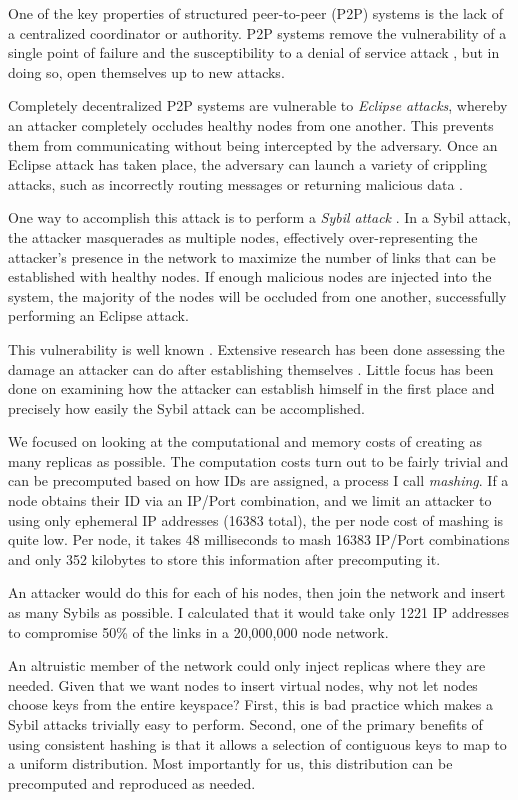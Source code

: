 One of the key properties of structured peer-to-peer (P2P) systems is the lack of a centralized coordinator or authority.
P2P systems remove the vulnerability of a single point of failure and the susceptibility to a denial of service attack \cite{sybil}, but in doing so, open themselves up to new attacks.

Completely decentralized P2P systems are vulnerable to \textit{Eclipse attacks}, whereby an attacker completely occludes healthy nodes from one another.
This prevents them from communicating without being intercepted by the adversary.
Once an Eclipse attack has taken place, the adversary can launch a variety of crippling attacks, such as incorrectly routing messages or returning malicious data \cite{srivatsa2004vulnerabilities}.



One way to accomplish this attack is to perform a \emph{Sybil attack} \cite{sybil}.
In a Sybil attack, the attacker masquerades as multiple nodes, effectively over-representing the attacker's presence in the network to maximize the number of links that can be established with healthy nodes.
If enough malicious nodes are injected into the system, the majority of the nodes will be occluded from one another, successfully performing an Eclipse attack.

This vulnerability is well known \cite{dhtsec}. 
Extensive research has been done assessing the damage an attacker can do after establishing themselves \cite{srivatsa2004vulnerabilities}.
Little focus has been done on examining how the attacker can establish himself in the first place and precisely how easily the Sybil attack can be accomplished.

We focused on looking at the computational and memory costs of creating as many replicas as possible.
The computation costs turn out to be fairly trivial and can be precomputed based on how IDs are assigned, a process I call \textit{mashing}.
If a node obtains their ID via an IP/Port combination, and we limit an attacker to using only ephemeral IP addresses (16383 total), the per node cost of mashing is quite low.
Per node, it takes 48 milliseconds to mash 16383 IP/Port combinations and only 352 kilobytes to store this information after precomputing it.


An attacker would do this for each of his nodes, then join the network and insert as many Sybils as possible.
I calculated that it would take only 1221 IP addresses to compromise 50\% of the links in a 20,000,000 node network.

An altruistic member of the network could only inject replicas where they are needed.
Given that we want nodes to insert virtual nodes, why not let nodes choose keys from the entire keyspace?
First, this is bad practice which makes a Sybil attacks trivially easy to perform.
Second, one of the primary benefits of using consistent hashing is that it allows a selection of contiguous keys to map to a uniform distribution.
Most importantly for us, this distribution can be precomputed and reproduced as needed. 
